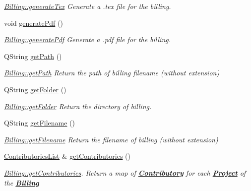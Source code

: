 \begin{DoxyCompactItemize}
\begin{DoxyCompactList}\small\item\em \hyperlink{classModels_1_1Billing_a3f835c6f4ea0b66c43bb7fec40c6e075}{Billing\+::generate\+Tex} Generate a .tex file for the billing. \end{DoxyCompactList}\item 
\hypertarget{classModels_1_1Billing_a27e273242564cdb68c14810a4580f8e5}{}void \hyperlink{classModels_1_1Billing_a27e273242564cdb68c14810a4580f8e5}{generate\+Pdf} ()\label{classModels_1_1Billing_a27e273242564cdb68c14810a4580f8e5}

\begin{DoxyCompactList}\small\item\em \hyperlink{classModels_1_1Billing_a27e273242564cdb68c14810a4580f8e5}{Billing\+::generate\+Pdf} Generate a .pdf file for the billing. \end{DoxyCompactList}\item 
Q\+String \hyperlink{classModels_1_1Billing_a4110ac32d8d96b9fbd1b0037df39723b}{get\+Path} ()
\begin{DoxyCompactList}\small\item\em \hyperlink{classModels_1_1Billing_a4110ac32d8d96b9fbd1b0037df39723b}{Billing\+::get\+Path} Return the path of billing filename (without extension) \end{DoxyCompactList}\item 
Q\+String \hyperlink{classModels_1_1Billing_a2359afe641ba85a37729fb0d951bff7d}{get\+Folder} ()
\begin{DoxyCompactList}\small\item\em \hyperlink{classModels_1_1Billing_a2359afe641ba85a37729fb0d951bff7d}{Billing\+::get\+Folder} Return the directory of billing. \end{DoxyCompactList}\item 
Q\+String \hyperlink{classModels_1_1Billing_ae8700d38ecd8e4975f1ee013144ed455}{get\+Filename} ()
\begin{DoxyCompactList}\small\item\em \hyperlink{classModels_1_1Billing_ae8700d38ecd8e4975f1ee013144ed455}{Billing\+::get\+Filename} Return the filename of billing (without extension) \end{DoxyCompactList}\item 
\hyperlink{classModels_1_1ContributoriesList}{Contributories\+List} \& \hyperlink{classModels_1_1Billing_af3d66c06d8c4d855b0efa5ff599a3ceb}{get\+Contributories} ()
\begin{DoxyCompactList}\small\item\em \hyperlink{classModels_1_1Billing_af3d66c06d8c4d855b0efa5ff599a3ceb}{Billing\+::get\+Contributories}. Return a map of {\bfseries \hyperlink{classModels_1_1Contributory}{Contributory}} for each {\bfseries \hyperlink{classModels_1_1Project}{Project}} of the {\bfseries \hyperlink{classModels_1_1Billing}{Billing}} \end{DoxyCompactList}\item 

\end{DoxyCompactItemize}
